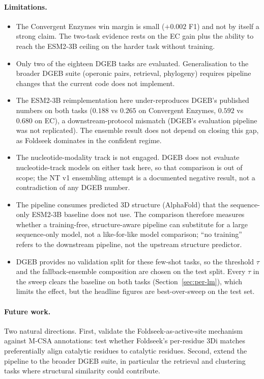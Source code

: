 \documentclass[11pt,letterpaper]{article}
\begin{document}
\paragraph{Limitations.}
\begin{itemize}
\item The Convergent Enzymes win margin is small ($+0.002$ F1) and
      not by itself a strong claim. The two-task evidence rests on
      the EC gain plus the ability to reach the ESM2-3B ceiling on
      the harder task without training.
\item Only two of the eighteen DGEB tasks are evaluated. Generalisation
      to the broader DGEB suite (operonic pairs, retrieval, phylogeny)
      requires pipeline changes that the current code does not
      implement.
\item The ESM2-3B reimplementation here under-reproduces DGEB's
      published numbers on both tasks ($0.188$ vs $0.265$ on
      Convergent Enzymes, $0.592$ vs $0.680$ on EC), a
      downstream-protocol mismatch (DGEB's evaluation pipeline was not
      replicated). The ensemble result does not depend on closing this
      gap, as Foldseek dominates in the confident regime.
\item The nucleotide-modality track is not engaged. DGEB does not
      evaluate nucleotide-track models on either task here, so that
      comparison is out of scope; the NT v1 ensembling attempt is a
      documented negative result, not a contradiction of any DGEB
      number.
\item The pipeline consumes predicted 3D structure (AlphaFold) that
      the sequence-only ESM2-3B baseline does not use. The comparison
      therefore measures whether a training-free, structure-aware
      pipeline can substitute for a large sequence-only model, not a
      like-for-like model comparison; ``no training'' refers to the
      downstream pipeline, not the upstream structure predictor.
\item DGEB provides no validation split for these few-shot tasks, so
      the threshold $\tau$ and the fallback-ensemble composition are
      chosen on the test split. Every $\tau$ in the sweep clears the
      baseline on both tasks (Section~\ref{sec:per-lm}), which limits
      the effect, but the headline figures are best-over-sweep on the
      test set.
\end{itemize}

\paragraph{Future work.} Two natural directions. First, validate the
Foldseek-as-active-site mechanism against M-CSA
\citep{ribeiro2018mcsa} annotations: test whether Foldseek's
per-residue 3Di matches preferentially align catalytic residues to
catalytic residues. Second, extend the pipeline to the broader DGEB
suite, in particular the retrieval and clustering tasks where
structural similarity could contribute.
\end{document}
